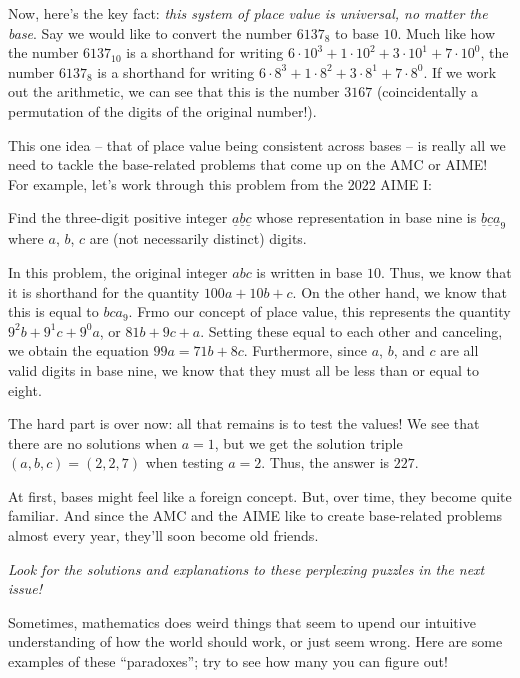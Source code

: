 \documentclass{article}
\begin{document}
\begin{multicols}{3}
Now, here’s the key fact: \textit{this system of place value is universal, no matter the base}. Say we would like to convert the number $6137_8$ to base $10$. 
Much like how the number $6137_{10}$ is a shorthand for writing $6\cdot{10}^3+1\cdot{10}^2+3\cdot 10^{1}+7\cdot 10^{0}$, the number $6137_8$ is a shorthand for writing $6\cdot 8^3+1\cdot 8^2+3\cdot 8^{1}+7\cdot 8^{0}$. If we work out the arithmetic, we can see that this is the number $3167$ (coincidentally a permutation of the digits of the original number!).

This one idea -- that of place value being consistent across bases -- is really all we need to tackle the base-related problems that come up on the AMC or AIME! For example, let's work through this problem from the 2022 AIME I:

Find the three-digit positive integer $\underline{a} \underline{b} \underline{c}$ whose representation in base nine is  $\underline{b}\underline{c}\underline{a}_9$ where $a$, $b$, $c$ are (not necessarily distinct) digits. 

In this problem, the original integer $abc$ is written in base $10$. Thus, we know that it is shorthand for the quantity $100a+10b+c$. On the other hand, we know that this is equal to $bca_9$. Frmo our concept of place value, this represents the quantity $9^2b+9^{1}c+9^{0}a$, or $81b+9c+a$. Setting these equal to each other and canceling, we obtain the equation $99a=71b+8c$. Furthermore, since $a$, $b$, and $c$ are all valid digits in base nine, we know that they must all be less than or equal to eight.

The hard part is over now: all that remains is to test the values! We see that there are no solutions when $a=1$, but we get the solution triple $(a,b,c)=(2,2,7)$ when testing $a=2$. Thus, the answer is $\boxed{227}$. 

At first, bases might feel like a foreign concept. But, over time, they become quite familiar. And since the AMC and the AIME like to create base-related problems almost every year, they'll soon become old friends. 
\closearticle

\textit{Look for the solutions and explanations to these perplexing puzzles in the next issue!}

Sometimes, mathematics does weird things that seem to upend our intuitive understanding of how the world should work, or just seem wrong. Here are some examples of these “paradoxes”; try to see how many you can figure out!


\end{multicols}
\end{document}
